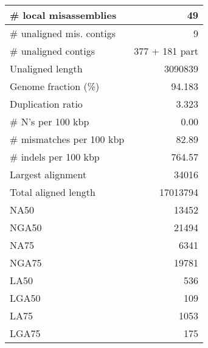 \documentclass[12pt,a4paper]{article}
\begin{document}
\begin{table}[ht]
\begin{center}
\begin{tabular}{|l*{1}{|r}|}
\# local misassemblies & 49 \\ \hline
\# unaligned mis. contigs & 9 \\ \hline
\# unaligned contigs & 377 + 181 part \\ \hline
Unaligned length & 3090839 \\ \hline
Genome fraction (\%) & 94.183 \\ \hline
Duplication ratio & 3.323 \\ \hline
\# N's per 100 kbp & 0.00 \\ \hline
\# mismatches per 100 kbp & 82.89 \\ \hline
\# indels per 100 kbp & 764.57 \\ \hline
Largest alignment & 34016 \\ \hline
Total aligned length & 17013794 \\ \hline
NA50 & 13452 \\ \hline
NGA50 & 21494 \\ \hline
NA75 & 6341 \\ \hline
NGA75 & 19781 \\ \hline
LA50 & 536 \\ \hline
LGA50 & 109 \\ \hline
LA75 & 1053 \\ \hline
LGA75 & 175 \\ \hline
\end{tabular}
\end{center}
\end{table}
\end{document}
